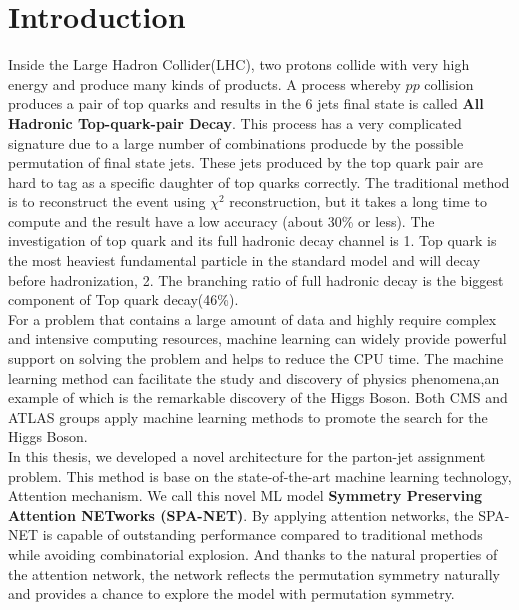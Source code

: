 
\chapter{Introduction} 

\newcommand{\comment}[1]{}

Inside the Large Hadron Collider(LHC), two protons collide with very high energy and produce many kinds of products. A process whereby $pp$ collision produces a pair of top quarks and results in the 6 jets final state is called \textbf{All Hadronic Top-quark-pair Decay}. This process has a very complicated signature due to a large number of combinations producde by the possible permutation of final state jets. These jets produced by the top quark pair are hard to tag as a specific daughter of top quarks correctly. The traditional method is to reconstruct the event using $\chi^{2}$ reconstruction, but it takes a long time to compute and the result have a low accuracy (about 30\% or less). The investigation of top quark and its full hadronic decay channel is 1. Top quark is the most heaviest  fundamental particle in the standard model and will decay before hadronization, 2. The branching ratio of full hadronic decay is the biggest component of Top quark decay(46\%). 
\\
For a problem that contains a large amount of data and highly require complex and intensive computing resources, machine learning can widely provide powerful support on solving the problem and helps to reduce the CPU time. The machine learning method can facilitate the study and discovery of physics phenomena,an example of which is the remarkable discovery of the Higgs Boson. Both CMS and ATLAS groups apply machine learning methods to promote the search for the Higgs Boson. \cite{Aad:2012tfa}\cite{Chatrchyan:2012ufa}
\\ 
In this thesis, we developed a novel architecture for the parton-jet assignment problem. This method is base on the state-of-the-art machine learning technology, Attention mechanism.\cite{A.Vaswani:2017} We call this novel ML model \textbf{Symmetry Preserving Attention NETworks (SPA-NET)}. By applying attention networks, the SPA-NET is capable of outstanding performance compared to traditional methods while avoiding combinatorial explosion. And thanks to the natural properties of the attention network, the network reflects the permutation symmetry naturally and provides a chance to explore the model with permutation symmetry. 
